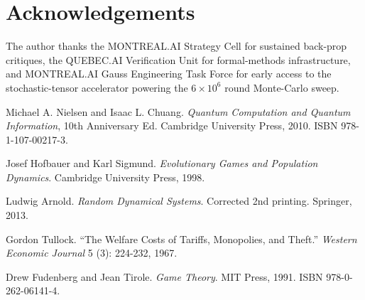 \documentclass[11pt]{article}
\theoremstyle{plain}
\begin{document}
\section*{Acknowledgements}

\vspace{-0.5ex}
\noindent
The author thanks the \textsc{MONTREAL.AI} Strategy Cell for sustained
back-prop critiques, the \textsc{QUEBEC.AI} Verification Unit for
formal-methods infrastructure, and \textsc{MONTREAL.AI} Gauss Engineering Task Force for early access
to the stochastic-tensor accelerator powering the $6\times10^{6}$
round Monte-Carlo sweep.

\begin{thebibliography}{9}\itemsep2pt

Michael A. Nielsen and Isaac L. Chuang.  
\newblock \emph{Quantum Computation and Quantum Information}, 10th Anniversary Ed.  
Cambridge University Press, 2010. ISBN 978-1-107-00217-3.

Josef Hofbauer and Karl Sigmund.  
\newblock \emph{Evolutionary Games and Population Dynamics}.  
Cambridge University Press, 1998.  

Ludwig Arnold.  
\newblock \emph{Random Dynamical Systems}. Corrected 2nd printing.  
Springer, 2013. 

Gordon Tullock.  
\newblock “The Welfare Costs of Tariffs, Monopolies, and Theft.”  
\emph{Western Economic Journal} 5 (3): 224-232, 1967.  

Drew Fudenberg and Jean Tirole.  
\newblock \emph{Game Theory}. MIT Press, 1991. ISBN 978-0-262-06141-4.

\end{thebibliography}
\end{document}
